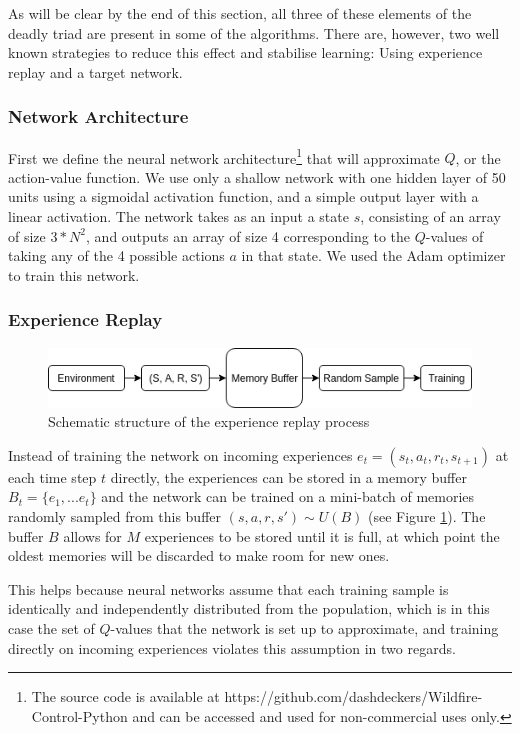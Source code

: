 As will be clear by the end of this section, all three of these elements of the deadly triad are present in some of the algorithms. There are, however, two well known strategies to reduce this effect and stabilise learning: Using experience replay and a target network.

\subsubsection{Network Architecture}\label{sec:architecture}
First we define the neural network architecture\footnote{The source code is available at https://github.com/dashdeckers/Wildfire-Control-Python and can be accessed and used for non-commercial uses only.} that will approximate $Q$, or the action-value function. We use only a shallow network with one hidden layer of 50 units using a sigmoidal activation function, and a simple output layer with a linear activation. The network takes as an input a state $s$, consisting of an array of size $3*N^2$, and outputs an array of size 4 corresponding to the $Q$-values of taking any of the 4 possible actions $a$ in that state. We used the Adam optimizer to train this network.

\subsubsection{Experience Replay}\label{sec:exp_replay}
\begin{figure}[h]
    \centering
    \includegraphics[width=1\linewidth]{img/Experience_Replay.png}
    \caption{Schematic structure of the experience replay process}
    \label{fig:expreplay}
\end{figure}
Instead of training the network on incoming experiences $e_t=(s_t,a_t,r_t,s_{t+1})$ at each time step $t$ directly, the experiences can be stored in a memory buffer $B_t=\{e_1,...e_t\}$ and the network can be trained on a mini-batch of memories randomly sampled from this buffer $(s,a,r,s') \sim U(B)$ (see Figure \ref{fig:expreplay}). The buffer $B$ allows for $M$ experiences to be stored until it is full, at which point the oldest memories will be discarded to make room for new ones.

This helps because neural networks assume that each training sample is identically and independently distributed from the population, which is in this case the set of $Q$-values that the network is set up to approximate, and training directly on incoming experiences violates this assumption in two regards.

